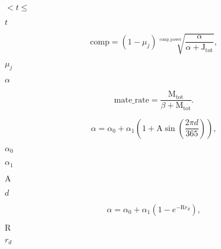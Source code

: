 \documentclass{article}
\begin{document}
$ < t \le $
\pagebreak

$ t $
\pagebreak

\[
 \textrm{comp} = (1 - \mu_j)    \sqrt[\textrm{comp_power}]{\frac{\alpha}{\alpha + \textrm{J}_{\textrm{tot}}}},
\]
\pagebreak

$ \mu_j $
\pagebreak

$ \alpha $
\pagebreak

\[ 
  \textrm{mate_rate} =  \frac{\textrm{M}_{\textrm{tot}}}{\beta + \textrm{M}_{\textrm{tot}}}.
\]
\pagebreak

\[
     \alpha = \alpha_0 + \alpha_1 \left(1 + \textrm{A}\sin\left(\frac{2 \pi d}{365}\right)\right),
\]
\pagebreak

$ \alpha_0 $
\pagebreak

$ \alpha_1 $
\pagebreak

$ \textrm{A} $
\pagebreak

$ d $
\pagebreak

\[
     \alpha = \alpha_0 + \alpha_1 (1 - e^{-\textrm{R} r_d}),
\]
\pagebreak

$ \textrm{R} $
\pagebreak

$ r_d $
\pagebreak
\end{document}
